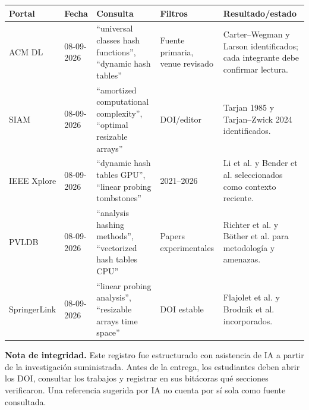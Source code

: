 \small
\begin{longtable}{p{2.3cm}p{1.7cm}p{4.2cm}p{3cm}p{3.45cm}}
\toprule Portal & Fecha & Consulta & Filtros & Resultado/estado \\
\midrule\endfirsthead
ACM DL & 08-09-2026 & ``universal classes hash functions'', ``dynamic hash tables'' & Fuente primaria, venue revisado & Carter--Wegman y Larson identificados; cada integrante debe confirmar lectura.\\
SIAM & 08-09-2026 & ``amortized computational complexity'', ``optimal resizable arrays'' & DOI/editor & Tarjan 1985 y Tarjan--Zwick 2024 identificados.\\
IEEE Xplore & 08-09-2026 & ``dynamic hash tables GPU'', ``linear probing tombstones'' & 2021--2026 & Li et al. y Bender et al. seleccionados como contexto reciente.\\
PVLDB & 08-09-2026 & ``analysis hashing methods'', ``vectorized hash tables CPU'' & Papers experimentales & Richter et al. y Böther et al. para metodología y amenazas.\\
SpringerLink & 08-09-2026 & ``linear probing analysis'', ``resizable arrays time space'' & DOI estable & Flajolet et al. y Brodnik et al. incorporados.\\
\bottomrule
\end{longtable}
\normalsize

\textbf{Nota de integridad.} Este registro fue estructurado con asistencia de IA a partir de la investigación suministrada. Antes de la entrega, los estudiantes deben abrir los DOI, consultar los trabajos y registrar en sus bitácoras qué secciones verificaron. Una referencia sugerida por IA no cuenta por sí sola como fuente consultada.
